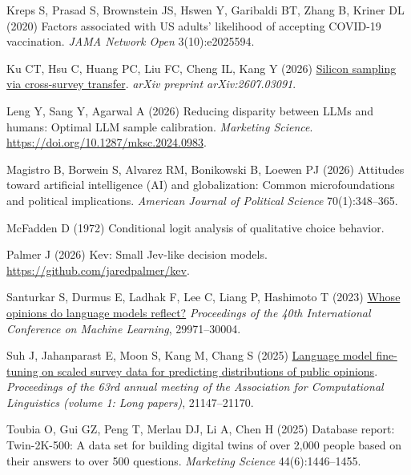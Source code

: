 \documentclass[
  11pt,
  letterpaper,
]{article}
\newlength{\cslhangindent}
\newenvironment{CSLReferences}[2] %
 {\begin{list}{}{%
  \setlength{\itemindent}{0pt}
  \setlength{\leftmargin}{0pt}
  \setlength{\parsep}{0pt}
  \ifodd #1
   \setlength{\leftmargin}{\cslhangindent}
   \setlength{\itemindent}{-1\cslhangindent}
  \fi
  \setlength{\itemsep}{#2\baselineskip}}}
 {\end{list}}
\begin{document}
\begin{CSLReferences}{1}{0}
Kreps S, Prasad S, Brownstein JS, Hswen Y, Garibaldi BT, Zhang B, Kriner
DL (2020) Factors associated with {US} adults' likelihood of accepting
COVID-19 vaccination. \emph{JAMA Network Open} 3(10):e2025594.

Ku CT, Hsu C, Huang PC, Liu FC, Cheng IL, Kang Y (2026)
\href{https://arxiv.org/abs/2607.03091}{Silicon sampling via
cross-survey transfer}. \emph{arXiv preprint arXiv:2607.03091}.

Leng Y, Sang Y, Agarwal A (2026) Reducing disparity between {LLM}s and
humans: Optimal {LLM} sample calibration. \emph{Marketing Science}.
\url{https://doi.org/10.1287/mksc.2024.0983}.

Magistro B, Borwein S, Alvarez RM, Bonikowski B, Loewen PJ (2026)
Attitudes toward artificial intelligence (AI) and globalization: Common
microfoundations and political implications. \emph{American Journal of
Political Science} 70(1):348--365.

McFadden D (1972) Conditional logit analysis of qualitative choice
behavior.

Palmer J (2026) Kev: Small {Jev}-like decision models.
\url{https://github.com/jaredpalmer/kev}.

Santurkar S, Durmus E, Ladhak F, Lee C, Liang P, Hashimoto T (2023)
\href{https://proceedings.mlr.press/v202/santurkar23a.html}{Whose
opinions do language models reflect?} \emph{Proceedings of the 40th
{International Conference on Machine Learning}}, 29971--30004.

Suh J, Jahanparast E, Moon S, Kang M, Chang S (2025)
\href{https://doi.org/10.18653/v1/2025.acl-long.1028}{Language model
fine-tuning on scaled survey data for predicting distributions of public
opinions}. \emph{Proceedings of the 63rd annual meeting of the
{A}ssociation for {C}omputational {L}inguistics (volume 1: Long
papers)}, 21147--21170.

Toubia O, Gui GZ, Peng T, Merlau DJ, Li A, Chen H (2025) Database
report: {Twin-2K-500}: A data set for building digital twins of over
2,000 people based on their answers to over 500 questions.
\emph{Marketing Science} 44(6):1446--1455.


\end{CSLReferences}
\end{document}
